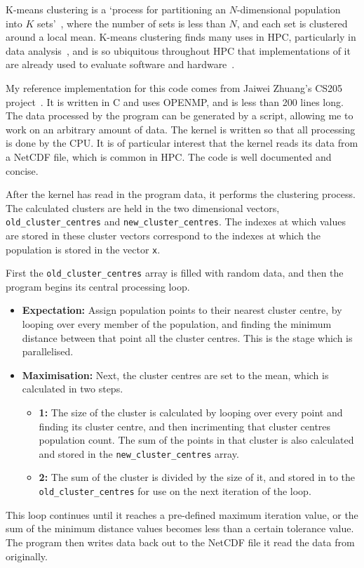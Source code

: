 K-means clustering is a `process for partitioning an $N$-dimensional population into $K$ sets'~\cite{macqueen1967}, where the number of sets is less than $N$, and each set is clustered around a local mean. K-means clustering finds many uses in HPC, particularly in data analysis~\cite{DBLP:journals/corr/ChakrabortyND14a, ordovas2014fast}, and is so ubiquitous throughout HPC that implementations of it are already used to evaluate software and hardware~\cite{Yang2014}.

My reference implementation for this code comes from Jaiwei Zhuang's CS205 project~\cite{CS205}. It is written in C and uses OPENMP, and is less than 200 lines long. The data processed by the program can be generated by a script, allowing me to work on an arbitrary amount of data. The kernel is written so that all processing is done by the CPU\@. It is of particular interest that the kernel reads its data from a NetCDF file, which is common in HPC\@. The code is well documented and concise.

After the kernel has read in the program data, it performs the clustering process. The calculated clusters are held in the two dimensional vectors, \texttt{old\_cluster\_centres} and \texttt{new\_cluster\_centres}. The indexes at which values are stored in these cluster vectors correspond to the indexes at which the population is stored in the vector \texttt{x}.

First the \texttt{old\_cluster\_centres} array is filled with random data, and then the program begins its central processing loop.

\begin{itemize}
  \item \textbf{Expectation:} Assign population points to their nearest cluster centre, by looping over every member of the population, and finding the minimum distance between that point all the cluster centres. This is the stage which is parallelised.
  \item \textbf{Maximisation:} Next, the cluster centres are set to the mean, which is calculated in two steps.
  \begin{itemize}
    \item \textbf{1:} The size of the cluster is calculated by looping over every point and finding its cluster centre, and then incrimenting that cluster centres population count. The sum of the points in that cluster is also calculated and stored in the \texttt{new\_cluster\_centres} array.
   \item \textbf{2:} The sum of the cluster is divided by the size of it, and stored in to the \texttt{old\_cluster\_centres} for use on the next iteration of the loop.
   \end{itemize}
\end{itemize}
This loop continues until it reaches a pre-defined maximum iteration value, or the sum of the minimum distance values becomes less than a certain tolerance value. The program then writes data back out to the NetCDF file it read the data from originally.

